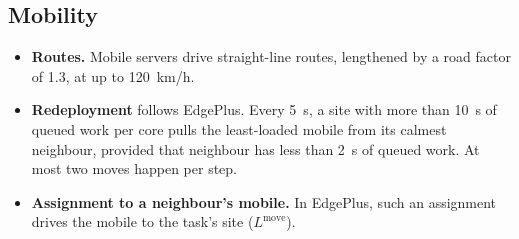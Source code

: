 \documentclass[11pt,journal,onecolumn]{IEEEtran}
\begin{document}
\subsection{Mobility}
\label{sec:mobility}
\begin{itemize}
\item \textbf{Routes.} Mobile servers drive straight-line routes, lengthened by a road factor of 1.3, at up to 120~km/h.
\item \textbf{Redeployment} follows EdgePlus. Every 5~s, a site with more than 10~s of queued work per core pulls the least-loaded mobile from its calmest neighbour, provided that neighbour has less than 2~s of queued work. At most two moves happen per step.
\item \textbf{Assignment to a neighbour's mobile.} In EdgePlus, such an assignment drives the mobile to the task's site ($L^{\mathrm{move}}$).
\end{itemize}
\end{document}
